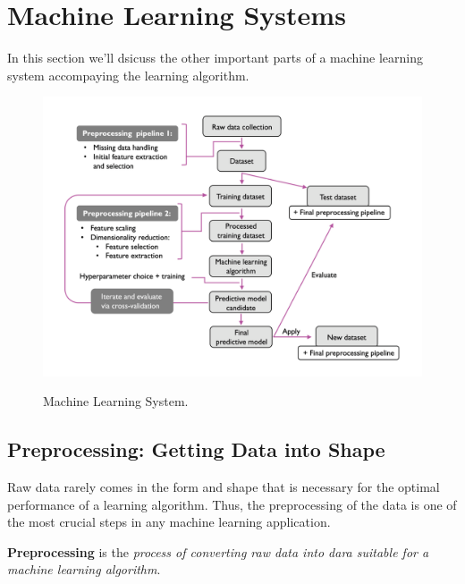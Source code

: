 \documentclass[../machine_learning_scikit.tex]{subfiles}
\begin{document}
    \section{Machine Learning Systems}

    In this section we'll dsicuss the other important parts of a machine learning system accompaying the learning algorithm.

    \begin{figure}[h]
        \begin{minipage}{\textwidth}
            \centering
            \includegraphics[scale=1]{images/machine_learning_system.png} \\
            \caption{Machine Learning System.}
            \label{figure:machine_learning_system}
        \end{minipage}
    \end{figure}

    \subsection{Preprocessing: Getting Data into Shape}

    Raw data rarely comes in the form and shape that is necessary for the optimal performance of a learning algorithm. Thus, the preprocessing of the data is one of the most crucial steps in any machine learning application.

    \begin{mydef}
        \textbf{Preprocessing} is the \textit{process of converting raw data into dara suitable for a machine learning algorithm}.
    \end{mydef}
\end{document}
